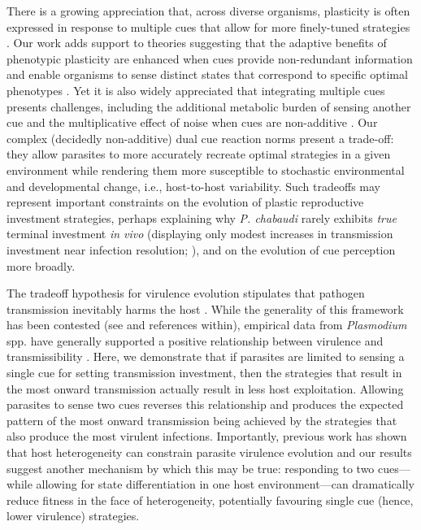 \documentclass[10pt,letterpaper]{article}
\begin{document}
There is a growing appreciation that, across diverse organisms, plasticity is often expressed in response to multiple cues that allow for more finely-tuned strategies \cite{kasumovic_multidimensional_2013,dore_role_2018, westneat_causes_2019}. Our work adds support to theories suggesting that the adaptive benefits of phenotypic plasticity are enhanced when cues provide non-redundant information \cite{moller_why_1993} and enable organisms to sense distinct states that correspond to specific optimal phenotypes \cite{getty_maintenance_1996}. Yet it is also widely appreciated that integrating multiple cues presents challenges, including the additional metabolic burden of sensing another cue \cite{dewitt_costs_1998} and the multiplicative effect of noise when cues are non-additive \cite{westneat_causes_2019}. Our complex (decidedly non-additive) dual cue reaction norms present a trade-off: they allow parasites to more accurately recreate optimal strategies in a given environment while rendering them more susceptible to stochastic environmental and developmental change, i.e., host-to-host variability. Such tradeoffs may represent important constraints on the evolution of plastic reproductive investment strategies, perhaps explaining why \emph{P. chabaudi} rarely exhibits \emph{true} terminal investment \emph{in vivo} (displaying only modest increases in transmission investment near infection resolution; \cite{buckling_plasmodium_1999, schneider_adaptive_2018}), and on the evolution of cue perception more broadly.\newline

The tradeoff hypothesis for virulence evolution stipulates that pathogen transmission inevitably harms the host \cite{anderson_coevolution_1982}. While the generality of this framework has been contested (see \cite{alizon_virulence_2009} and references within), empirical data from \emph{Plasmodium} spp. have generally supported a positive relationship between virulence and transmissibility \cite{mackinnon_genetic_1999,mackinnon_virulence_2002,mackinnon_effects_2003, paul_experimental_2004}. Here, we demonstrate that if parasites are limited to sensing a single cue for setting transmission investment, then the strategies that result in the most onward transmission actually result in less host exploitation. Allowing parasites to sense two cues reverses this relationship and produces the expected pattern of the most onward transmission being achieved by the strategies that also produce the most virulent infections. Importantly, previous work has shown that host heterogeneity can constrain parasite virulence evolution \cite{regoes_evolution_2000,williams_new_2012, white_host_2020} and our results suggest another mechanism by which this may be true: responding to two cues---while allowing for state differentiation in one host environment---can dramatically reduce fitness in the face of heterogeneity, potentially favouring single cue (hence, lower virulence) strategies.\newline
\end{document}
